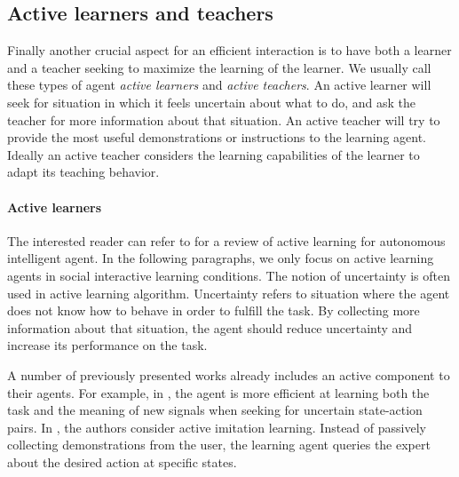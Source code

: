 \subsection{Active learners and teachers}

Finally another crucial aspect for an efficient interaction is to have both a learner and a teacher seeking to maximize the learning of the learner. We usually call these types of agent \emph{active learners} and \emph{active teachers}. An active learner will seek for situation in which it feels uncertain about what to do, and ask the teacher for more information about that situation. An active teacher will try to provide the most useful demonstrations or instructions to the learning agent. Ideally an active teacher considers the learning capabilities of the learner to adapt its teaching behavior. 

\paragraph{Active learners} 

The interested reader can refer to \cite{lopes2014active} for a review of active learning for autonomous intelligent agent. In the following paragraphs, we only focus on active learning agents in social interactive learning conditions. The notion of uncertainty is often used in active learning algorithm. Uncertainty refers to situation where the agent does not know how to behave in order to fulfill the task. By collecting more information about that situation, the agent should reduce uncertainty and increase its performance on the task.



A number of previously presented works already includes an active component to their agents. For example, in \cite{macl11simul}, the agent is more efficient at learning both the task and the meaning of new signals when seeking for uncertain state-action pairs. In \cite{judah2012active}, the authors consider active imitation learning. Instead of passively collecting demonstrations from the user, the learning agent queries the expert about the desired action at specific states.

